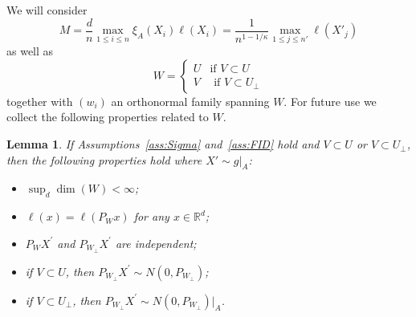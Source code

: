 \documentclass[]{article}
\newcommand{\R}{\mathbb{R}}
\theoremstyle{plain}
\newtheorem{lemma}{Lemma}[section]
\theoremstyle{definition}
\begin{document}
We will consider
\begin{equation} \label{eq:M}
	M = \frac{d}{n} \max_{1 \leq i \leq n} \xi_A(X_i) \ell(X_i) = \frac{1}{n^{1-1/\kappa}} \max_{1 \leq j \leq n'} \ell(X'_j)
\end{equation}
as well as
\begin{equation} \label{eq:W}
	W = \left\{ \begin{array}{ll} U & \text{if } V \subset U\\V & \text { if } V \subset U_\perp \end{array} \right.
\end{equation}
together with $(w_i)$ an orthonormal family spanning $W$. For future use we collect the following properties related to $W$.

\begin{lemma}\label{lemma:W}
	If Assumptions~\ref{ass:Sigma} and~\ref{ass:FID} hold and $V \subset U$ or $V \subset U_\perp$, then the following properties hold where $X' \sim g|_A$:
	\begin{itemize}
		\item $\sup_d \dim(W) < \infty$;
		\item $\ell(x) = \ell(P_W x)$ for any $x \in \R^d$;
		\item $P_W X^\prime$ and $P_{W_\perp} X^\prime$ are independent;
		\item if $V \subset U$, then $P_{W_\perp} X^\prime \sim N(0, P_{W_\perp})$;
		\item if $V \subset U_\perp$, then $P_{W_\perp} X^\prime \sim N(0, P_{W_\perp})|_A$.
	\end{itemize}
\end{lemma}
\end{document}

